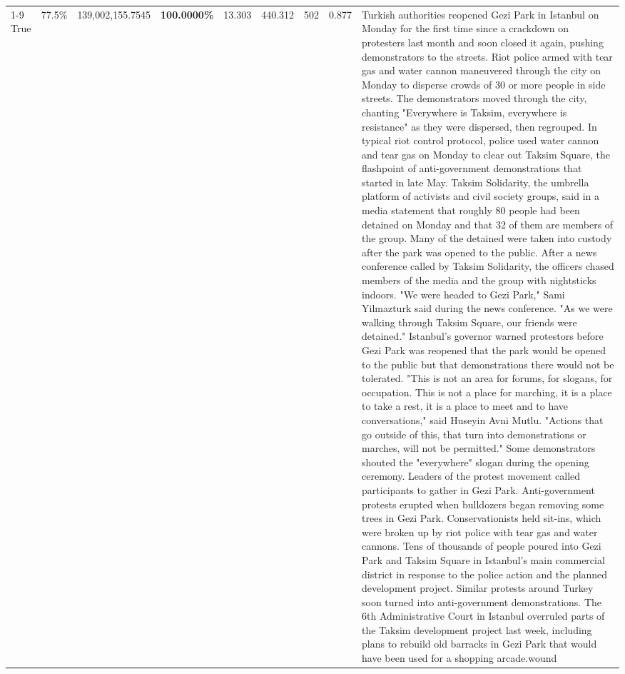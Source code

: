 \begin{table}[H]
\begin{tabular}{lllrlllll}
\cline{1-9}
True & 77.5\% & 139,002,155.7545 & \bfseries \color{red} 100.0000\% & 13.303 & 440.312 & 502 & 0.877 & Turkish authorities reopened Gezi Park in Istanbul on Monday for the first time since a crackdown on protesters last month and soon closed it again, pushing demonstrators to the streets. Riot police armed with tear gas and water cannon maneuvered through the city on Monday to disperse crowds of 30 or more people in side streets. The demonstrators moved through the city, chanting "Everywhere is Taksim, everywhere is resistance" as they were dispersed, then regrouped. In typical riot control protocol, police used water cannon and tear gas on Monday to clear out Taksim Square, the flashpoint of anti-government demonstrations that started in late May. Taksim Solidarity, the umbrella platform of activists and civil society groups, said in a media statement that roughly 80 people had been detained on Monday and that 32 of them are members of the group. Many of the detained were taken into custody after the park was opened to the public. After a news conference called by Taksim Solidarity, the officers chased members of the media and the group with nightsticks indoors. "We were headed to Gezi Park," Sami Yilmazturk said during the news conference. "As we were walking through Taksim Square, our friends were detained." Istanbul's governor warned protestors before Gezi Park was reopened that the park would be opened to the public but that demonstrations there would not be tolerated. "This is not an area for forums, for slogans, for occupation. This is not a place for marching, it is a place to take a rest, it is a place to meet and to have conversations," said Huseyin Avni Mutlu. "Actions that go outside of this, that turn into demonstrations or marches, will not be permitted." Some demonstrators shouted the "everywhere" slogan during the opening ceremony. Leaders of the protest movement called participants to gather in Gezi Park. Anti-government protests erupted when bulldozers began removing some trees in Gezi Park. Conservationists held sit-ins, which were broken up by riot police with tear gas and water cannons. Tens of thousands of people poured into Gezi Park and Taksim Square in Istanbul's main commercial district in response to the police action and the planned development project. Similar protests around Turkey soon turned into anti-government demonstrations. The 6th Administrative Court in Istanbul overruled parts of the Taksim development project last week, including plans to rebuild old barracks in Gezi Park that would have been used for a shopping arcade.wound \\

\end{tabular}
\end{table}
